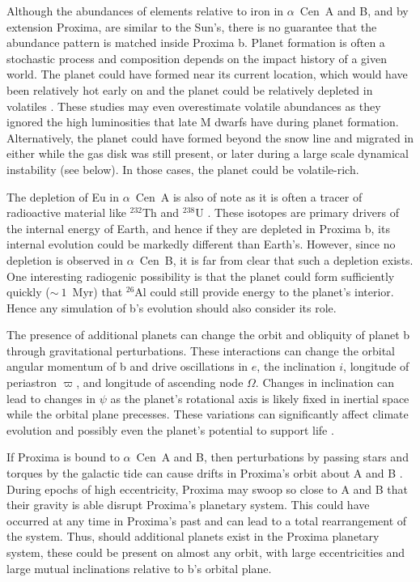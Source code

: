 \documentclass[preprint,12pt]{aastex}
\def\acen{{$\alpha$~Cen}}
\begin{document}
Although the abundances of elements relative to iron in \acen~A and B,
and by extension Proxima, are similar to the Sun's, there is no
guarantee that the abundance pattern is matched inside Proxima
b. Planet formation is often a stochastic process and composition
depends on the impact history of a given world. The planet could have
formed near its current location, which would have been relatively hot
early on and the planet could be relatively depleted in volatiles
\citep{Raymond07,Mulders15}. These studies may even overestimate
volatile abundances as they ignored the high luminosities that late M
dwarfs have during planet formation. Alternatively, the planet could
have formed beyond the snow line and migrated in either while the gas
disk was still present, or later during a large scale dynamical
instability (see below). In those cases, the planet could be
volatile-rich.


The depletion of Eu in \acen~A is also of note as it is often a tracer
of radioactive material like $^{232}$Th and $^{238}$U
\citep{Young14}. These isotopes are primary drivers of the internal
energy of Earth, and hence if they are depleted in Proxima b, its
internal evolution could be markedly different than Earth's. However,
since no depletion is observed in \acen~B, it is far from clear that
such a depletion exists. One interesting radiogenic possibility is
that the planet could form sufficiently quickly ($\sim~1$~Myr) that
$^{26}$Al could still provide energy to the planet's interior. Hence any
simulation of b's evolution should also consider its role.

The presence of additional planets can change the orbit and obliquity
of planet b through gravitational perturbations. These interactions
can change the orbital angular momentum of b and drive oscillations in
$e$, the inclination $i$, longitude of periastron $\varpi$, and
longitude of ascending node $\Omega$. Changes in inclination can lead
to changes in $\psi$ as the planet's rotational axis is likely fixed
in inertial space while the orbital plane precesses. These variations
can significantly affect climate evolution and possibly even the
planet's potential to support life \citep{Armstrong14}.

If Proxima is bound to \acen~A and B, then perturbations by passing
stars and torques by the galactic tide can cause drifts in Proxima's
orbit about A and B \citep{Kaib13}. During epochs of high
eccentricity, Proxima may swoop so close to A and B that their gravity
is able disrupt Proxima's planetary system. This could have occurred
at any time in Proxima's past and can lead to a total rearrangement of
the system. Thus, should additional planets exist in the Proxima
planetary system, these could be present on almost any orbit, with large
eccentricities and large mutual inclinations relative to b's orbital plane.
\end{document}
